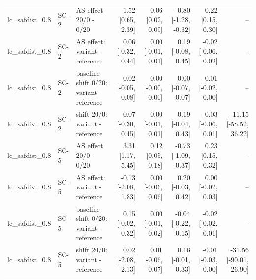 \begin{table}[htbp]
{\begin{tabular}{lllrrrrr}
lc\_safdist\_0.8 & SC-2 & AS effect 20/0 - 0/20 & 1.52 [0.65, 2.39] & 0.06 [0.02, 0.09] & -0.80 [-1.28, -0.32] & 0.22 [0.15, 0.30] & -- \\
lc\_safdist\_0.8 & SC-2 & AS effect: variant - reference & 0.06 [-0.32, 0.44] & 0.00 [-0.01, 0.01] & 0.19 [-0.08, 0.45] & -0.02 [-0.06, 0.02] & -- \\
lc\_safdist\_0.8 & SC-2 & baseline shift 0/20: variant - reference & 0.02 [-0.05, 0.08] & 0.00 [-0.00, 0.00] & 0.00 [-0.07, 0.07] & -0.01 [-0.02, 0.00] & -- \\
lc\_safdist\_0.8 & SC-2 & shift 20/0: variant - reference & 0.07 [-0.30, 0.45] & 0.00 [-0.01, 0.01] & 0.19 [-0.04, 0.43] & -0.03 [-0.06, 0.01] & -11.15 [-58.52, 36.22] \\
lc\_safdist\_0.8 & SC-5 & AS effect 20/0 - 0/20 & 3.31 [1.17, 5.45] & 0.12 [0.05, 0.18] & -0.73 [-1.09, -0.37] & 0.23 [0.15, 0.32] & -- \\
lc\_safdist\_0.8 & SC-5 & AS effect: variant - reference & -0.13 [-2.08, 1.83] & 0.00 [-0.06, 0.06] & 0.20 [-0.03, 0.42] & 0.00 [-0.02, 0.03] & -- \\
lc\_safdist\_0.8 & SC-5 & baseline shift 0/20: variant - reference & 0.15 [-0.02, 0.32] & 0.00 [-0.01, 0.02] & -0.04 [-0.22, 0.15] & -0.02 [-0.02, -0.01] & -- \\
lc\_safdist\_0.8 & SC-5 & shift 20/0: variant - reference & 0.02 [-2.08, 2.13] & 0.01 [-0.06, 0.07] & 0.16 [-0.01, 0.33] & -0.01 [-0.03, 0.00] & -31.56 [-90.01, 26.90] \\
\bottomrule
\end{tabular}}
\end{table}
